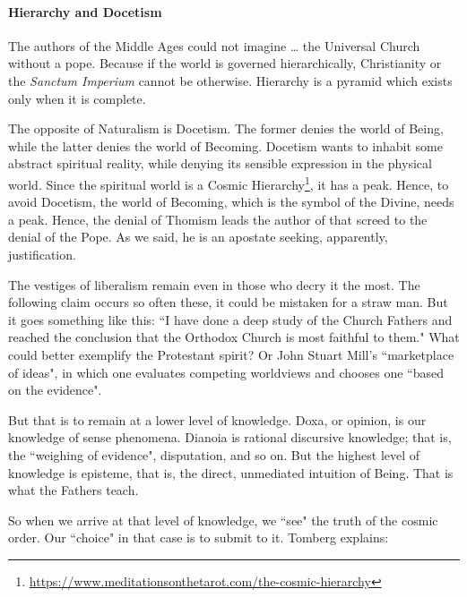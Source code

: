 \paragraph{Hierarchy and Docetism}
\begin{quotex}
The authors of the Middle Ages could not imagine … the Universal Church without a pope. Because if the world is governed hierarchically, Christianity or the \emph{Sanctum Imperium} cannot be otherwise. Hierarchy is a pyramid which exists only when it is complete. 

\end{quotex}
The opposite of Naturalism is Docetism. The former denies the world of Being, while the latter denies the world of Becoming. Docetism wants to inhabit some abstract spiritual reality, while denying its sensible expression in the physical world. Since the spiritual world is a Cosmic Hierarchy\footnote{\url{https://www.meditationsonthetarot.com/the-cosmic-hierarchy}}, it has a peak. Hence, to avoid Docetism, the world of Becoming, which is the symbol of the Divine, needs a peak. Hence, the denial of Thomism leads the author of that screed to the denial of the Pope. As we said, he is an apostate seeking, apparently, justification.

The vestiges of liberalism remain even in those who decry it the most. The following claim occurs so often these, it could be mistaken for a straw man. But it goes something like this: ``I have done a deep study of the Church Fathers and reached the conclusion that the Orthodox Church is most faithful to them." What could better exemplify the Protestant spirit? Or John Stuart Mill's ``marketplace of ideas", in which one evaluates competing worldviews and chooses one ``based on the evidence".

But that is to remain at a lower level of knowledge. Doxa, or opinion, is our knowledge of sense phenomena. Dianoia is rational discursive knowledge; that is, the ``weighing of evidence", disputation, and so on. But the highest level of knowledge is episteme, that is, the direct, unmediated intuition of Being. That is what the Fathers teach.

So when we arrive at that level of knowledge, we ``see" the truth of the cosmic order. Our ``choice" in that case is to submit to it. Tomberg explains:

